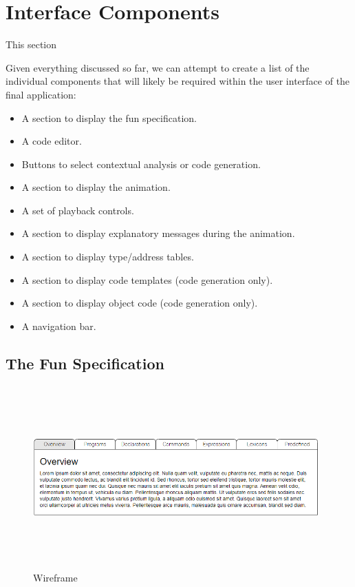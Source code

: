 \documentclass{l4proj}
\begin{document}
\section{Interface Components}
This section 

Given everything discussed so far, we can attempt to create a list of the individual components that will likely be required within the user interface of the final application:
\begin{itemize}
\item A section to display the fun specification.
\item A code editor.
\item Buttons to select contextual analysis or code generation.
\item A section to display the animation.
\item A set of playback controls.
\item A section to display explanatory messages during the animation.
\item A section to display type/address tables.
\item A section to display code templates (code generation only).
\item A section to display object code (code generation only).
\item A navigation bar.
\end{itemize}

\subsection{The Fun Specification}
\begin{figure}[h]
\centering
\includegraphics[height=7cm,width=11cm]{images/specification-wireframe.png}
\caption{Wireframe }
\label{fig:bentley-kernighan}	
\end{figure}


\begin{appendices}

\end{appendices}




\end{document}
